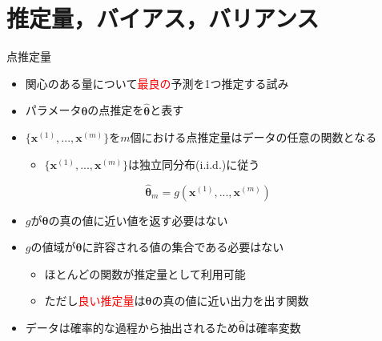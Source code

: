 \documentclass[dvipdfmx, 10pt]{beamer}
\begin{document}

\section{推定量，バイアス，バリアンス}


\begin{frame}{点推定量}
  \begin{itemize}
    \item 関心のある量について\textcolor{red}{最良の}予測を1つ推定する試み
    \item パラメータ$\bm{\theta}$の点推定を$\hat{\bm{\theta}}$と表す
    \item $\{\bm{x}^{(1)} , ..., \bm{x}^{(m)}\}$を$m$個における点推定量はデータの任意の関数となる
    \begin{itemize}
      \item $\{\bm{x}^{(1)} , ..., \bm{x}^{(m)}\}$は独立同分布(i.i.d.)に従う
    \end{itemize}
  \end{itemize}
  \begin{equation}
    \hat{\bm{\theta}}_{m} = g(\bm{x}^{(1)} , ..., \bm{x}^{(m)})
  \end{equation}
  \begin{itemize}
    \item $g$が$\bm{\theta}$の真の値に近い値を返す必要はない
    \item $g$の値域が$\bm{\theta}$に許容される値の集合である必要はない
    \begin{itemize}
      \item ほとんどの関数が推定量として利用可能
      \item ただし\textcolor{red}{良い推定量}は$\bm{\theta}$の真の値に近い出力を出す関数
    \end{itemize}
    \item データは確率的な過程から抽出されるため$\hat{\bm{\theta}}$は確率変数
  \end{itemize}
\end{frame}

\end{document}
